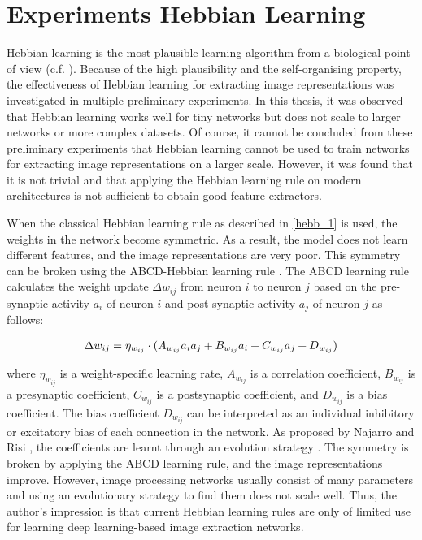 \pagebreak
\chapter{Experiments Hebbian Learning}
Hebbian learning is the most plausible learning algorithm from a biological point of view (c.f. ).
Because of the high plausibility and the self-organising property, the effectiveness of Hebbian learning for extracting image representations was investigated in multiple preliminary experiments.
In this thesis, it was observed that Hebbian learning works well for tiny networks but does not scale to larger networks or more complex datasets.
Of course, it cannot be concluded from these preliminary experiments that Hebbian learning cannot be used to train networks for extracting image representations on a larger scale.
However, it was found that it is not trivial and that applying the Hebbian learning rule on modern architectures is not sufficient to obtain good feature extractors.

When the classical Hebbian learning rule as described in \eqref{hebb_1} is used, the weights in the network become symmetric.
As a result, the model does not learn different features, and the image representations are very poor.
This symmetry can be broken using the ABCD-Hebbian learning rule .
The ABCD learning rule calculates the weight update \(\Delta w_{ij}\) from neuron \(i\) to neuron \(j\) based on the pre-synaptic activity \(a_i\) of neuron \(i\) and post-synaptic activity \(a_j\) of neuron \(j\) as follows:

\begin{align}\eqlbl{hebb_abcd}
	\Delta w_{ij} = \eta_{w_{ij}} \cdot (A_{w_{ij}} a_ia_j + B_{w_{ij}} a_i + C_{w_{ij}} a_j + D_{w_{ij}})
\end{align}

where \(\eta_{w_{ij}}\) is a weight-specific learning rate, \(A_{w_{ij}}\) is a correlation coefficient, \(B_{w_{ij}}\) is a presynaptic coefficient, \(C_{w_{ij}}\) is a postsynaptic coefficient, and \(D_{w_{ij}}\) is a bias coefficient.
The bias coefficient \(D_{w_{ij}}\) can be interpreted as an individual inhibitory or excitatory bias of each connection in the network.
As proposed by Najarro and Risi , the coefficients are learnt through an evolution strategy .
The symmetry is broken by applying the ABCD learning rule, and the image representations improve.
However, image processing networks usually consist of many parameters and using an evolutionary strategy to find them does not scale well.
Thus, the author's impression is that current Hebbian learning rules are only of limited use for learning deep learning-based image extraction networks.


